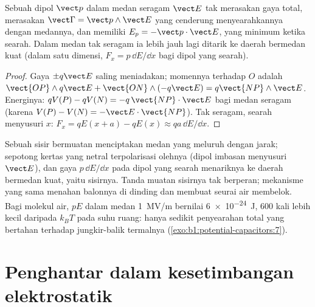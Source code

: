 \begin{proposition}\label{prop:b1:potential-capacitors:dipoleinfield}
Sebuah dipol $\vect p$ dalam medan seragam $\vect E$ tak merasakan gaya total,
merasakan  $\vect\Gamma = \vect p\wedge\vect E$ yang cenderung
menyearahkannya dengan medannya, dan memiliki  $E_p = -\vect p\cdot\vect E$,
yang minimum ketika searah. Dalam medan tak seragam ia lebih jauh lagi ditarik
ke daerah bermedan kuat (dalam satu dimensi, $F_x = p\,\dd E/\dd x$
bagi dipol yang searah).
\end{proposition}

\begin{proof}
Gaya $\pm q\vect E$ saling meniadakan; momennya terhadap $O$ adalah $\vect{OP}\wedge
q\vect E + \vect{ON}\wedge(-q\vect E) = q\vect{NP}\wedge\vect E$. Energinya:
$qV(P) - qV(N) = -q\,\vect{NP}\cdot\vect E$ bagi medan seragam (karena $V(P)
- V(N) = -\vect E\cdot\vect{NP}$). Tak seragam, searah menyusuri $x$: $F_x =
qE(x + a) - qE(x) \approx qa\,\dd E/\dd x$.
\end{proof}

\begin{example}\label{ex:b1:potential-capacitors:comb}
Sebuah sisir bermuatan menciptakan medan yang meluruh dengan jarak; sepotong
kertas yang netral terpolarisasi olehnya (dipol imbasan menyusuri $\vect E$), dan
gaya $p\,\dd E/\dd x$ pada dipol yang searah menariknya ke daerah
bermedan kuat, yaitu sisirnya. Tanda muatan sisirnya tak berperan;
mekanisme yang sama menahan balonnya di dinding dan membuat
seurai air membelok. Bagi molekul air, $pE$ dalam medan \qty{1}{MV/m}
bernilai \qty{6e-24}{J}, $600$ kali lebih kecil daripada $k_BT$ pada suhu ruang:
hanya sedikit penyearahan total yang bertahan terhadap jungkir-balik termalnya
(\cref{exo:b1:potential-capacitors:7}).
\end{example}

\section{Penghantar dalam kesetimbangan elektrostatik}


